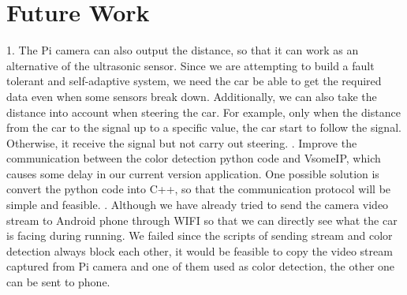 \documentclass[11pt, titlepage]{article} %
\begin{document}
\section{Future Work}
1.	The Pi camera can also output the distance, so that it can work as an alternative of the ultrasonic sensor. Since we are attempting to build a fault tolerant and self-adaptive system, we need the car be able to get the required data even when some sensors break down. Additionally, we can also take the distance into account when steering the car. For example, only when the distance from the car to the signal up to a specific value, the car start to follow the signal. Otherwise, it receive the signal but not carry out steering.
.	Improve the communication between the color detection python code and VsomeIP, which causes some delay in our current version application. One possible solution is convert the python code into C++, so that the communication protocol will be simple and feasible.
.	Although we have already tried to send the camera video stream to Android phone through WIFI so that we can directly see what the car is facing during running. We failed since the scripts of sending stream and color detection always block each other, it would be feasible to copy the video stream captured from Pi camera and one of them used as color detection, the other one can be sent to phone.
\clearpage




\clearpage
\clearpage
\appendix
\clearpage
\end{document}
